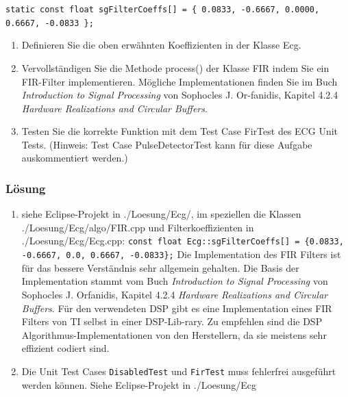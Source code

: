 \texttt{static const float sgFilterCoeffs[] = \{ 0.0833, -0.6667, 0.0000, 0.6667, -0.0833 \};}

\begin{enumerate}
  \item Definieren Sie die oben erwähnten Koeffizienten in der Klasse Ecg.
\item  Vervollständigen Sie die Methode process() der Klasse FIR indem Sie ein FIR-Filter implementieren. Mögliche Implementationen finden Sie im Buch \textit{Introduction to Signal Processing} von Sophocles J. Or-fanidis, Kapitel 4.2.4 \textit{Hardware Realizations and Circular Buffers}.
\item Testen Sie die korrekte Funktion mit dem Test Case FirTest des ECG Unit Tests. (Hinweis: Test Case PulseDetectorTest kann für diese Aufgabe auskommentiert werden.)
\end{enumerate}

\subsubsection{Lösung}

\begin{enumerate}
  \item siehe Eclipse-Projekt in ./Loesung/Ecg/, im speziellen die Klassen ./Loesung/Ecg/algo/FIR.cpp und Filterkoeffizienten in ./Loesung/Ecg/Ecg.cpp:
\texttt{const float Ecg::sgFilterCoeffs[] = \{0.0833, -0.6667, 0.0, 0.6667, -0.0833\};}
Die Implementation des FIR Filters ist für das bessere Verständnis sehr allgemein gehalten. Die Basis der Implementation stammt vom Buch \textit{Introduction to Signal Processing} von Sophocles J. Orfanidis, Kapitel 4.2.4 \textit{Hardware Realizations and Circular Buffers}.
Für den verwendeten DSP gibt es eine Implementation eines FIR Filters von TI selbst in einer DSP-Lib-rary. Zu empfehlen sind die DSP Algorithmus-Implementationen von den Herstellern, da sie meistens sehr effizient codiert sind.
\item Die Unit Test Cases \texttt{DisabledTest} und \texttt{FirTest} muss fehlerfrei ausgeführt werden können. Siehe Eclipse-Projekt in ./Loesung/Ecg
\end{enumerate}


\noindent\makebox[\linewidth]{\rule{\paperwidth}{0.4pt}}

\noindent\makebox[\linewidth]{\rule{\paperwidth}{0.4pt}}

\noindent\makebox[\linewidth]{\rule{\paperwidth}{0.4pt}}


